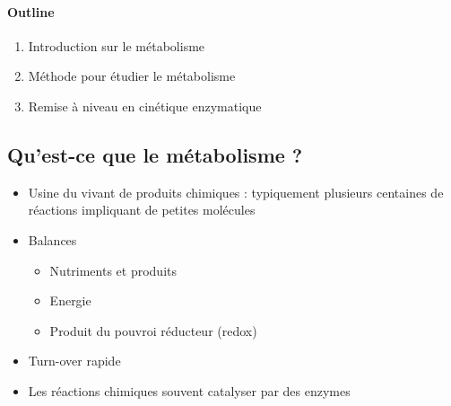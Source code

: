 \paragraph{Outline}
\begin{enumerate}
    \item Introduction sur le métabolisme
    \item Méthode pour étudier le métabolisme
    \item Remise à niveau en cinétique enzymatique
\end{enumerate}



\subsection {Qu'est-ce que le métabolisme ?}
\begin{itemize}
    \item Usine du vivant de produits chimiques : typiquement plusieurs centaines de réactions impliquant de petites molécules 
    \item Balances
        \begin{itemize}
            \item Nutriments et produits
            \item Energie
            \item Produit du pouvroi réducteur (redox)
        \end{itemize}
    \item Turn-over rapide
    \item Les réactions chimiques souvent catalyser par des enzymes
\end{itemize} 


